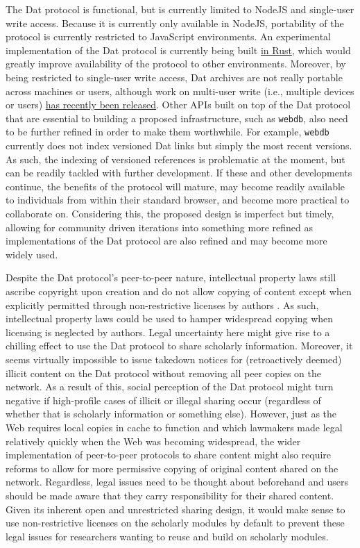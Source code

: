 \documentclass[publications,article,submit,moreauthors,pdftex,10pt,a4paper]{Definitions/mdpi}
\begin{document}
The Dat protocol is functional, but is currently limited to NodeJS and
single-user write access. Because it is currently only available in
NodeJS, portability of the protocol is currently restricted to
JavaScript environments. An experimental implementation of the Dat
protocol is currently being built \href{https://github.com/datrs}{in
Rust}, which would greatly improve availability of the protocol to other
environments. Moreover, by being restricted to single-user write access,
Dat archives are not really portable across machines or users, although
work on multi-user write (i.e., multiple devices or users)
\href{https://github.com/mafintosh/hyperdb}{has recently been released}.
Other APIs built on top of the Dat protocol that are essential to
building a proposed infrastructure, such as \texttt{webdb}, also need to
be further refined in order to make them worthwhile. For example,
\texttt{webdb} currently does not index versioned Dat links but simply
the most recent versions. As such, the indexing of versioned references
is problematic at the moment, but can be readily tackled with further
development. If these and other developments continue, the benefits of
the protocol will mature, may become readily available to individuals
from within their standard browser, and become more practical to
collaborate on. Considering this, the proposed design is imperfect but
timely, allowing for community driven iterations into something more
refined as implementations of the Dat protocol are also refined and may
become more widely used.

Despite the Dat protocol's peer-to-peer nature, intellectual property
laws still ascribe copyright upon creation and do not allow copying of
content except when explicitly permitted through non-restrictive
licenses by authors \citep{isbn:9781400851911}. As such, intellectual property laws
could be used to hamper widespread copying when licensing is neglected
by authors. Legal uncertainty here might give rise to a chilling effect
to use the Dat protocol to share scholarly information. Moreover, it
seems virtually impossible to issue takedown notices for (retroactively
deemed) illicit content on the Dat protocol without removing all peer
copies on the network. As a result of this, social perception of the Dat
protocol might turn negative if high-profile cases of illicit or illegal
sharing occur (regardless of whether that is scholarly information or
something else). However, just as the Web requires local copies in cache
to function and which lawmakers made legal relatively quickly when the
Web was becoming widespread, the wider implementation of peer-to-peer
protocols to share content might also require reforms to allow for more
permissive copying of original content shared on the network.
Regardless, legal issues need to be thought about beforehand and users
should be made aware that they carry responsibility for their shared
content. Given its inherent open and unrestricted sharing design, it
would make sense to use non-restrictive licenses on the scholarly
modules by default to prevent these legal issues for researchers wanting
to reuse and build on scholarly modules.
\end{document}
